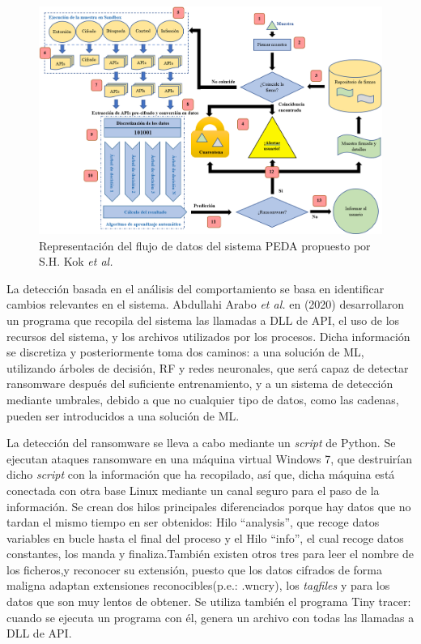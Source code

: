 \begin{figure}[htb]
\begin{center}
\includegraphics[width=1\linewidth]{images/peda2.PNG}
\end{center}
\caption{Representación del flujo de datos del sistema PEDA propuesto por S.H. Kok \textit{et al.} \cite{Kok2020}}
\label{fig:peda2}
\end{figure}

La detección basada en el análisis del comportamiento se basa en identificar cambios relevantes en el sistema. Abdullahi Arabo \textit{et al.} en \cite{ARABO2020289} (2020) desarrollaron un programa que recopila del sistema las llamadas a \gls{DLL} de \gls{API}, el uso de los recursos del sistema, y los archivos utilizados por  los procesos. Dicha información se discretiza y posteriormente toma dos caminos: a una solución de \gls{ML}, utilizando árboles de decisión, \gls{RF} y redes neuronales, que será capaz de detectar ransomware después del suficiente entrenamiento, y a un sistema de detección mediante umbrales, debido a que no cualquier tipo de datos, como las cadenas, pueden ser introducidos a una solución de \gls{ML}.

La detección del ransomware se lleva a cabo mediante un \textit{script} de Python. Se ejecutan ataques ransomware en una máquina virtual Windows 7, que destruirían dicho \textit{script} con la información que ha recopilado, así que, dicha máquina está conectada con otra base Linux mediante un canal seguro para el paso de la información. Se crean dos hilos principales diferenciados porque hay datos que no tardan el mismo tiempo en ser obtenidos: Hilo ``analysis'', que recoge datos variables en bucle hasta el final del proceso y el  Hilo ``info'', el cual recoge datos constantes, los manda y finaliza.También existen otros tres para leer el nombre de los ficheros,y reconocer su extensión, puesto que los datos cifrados de forma maligna adaptan extensiones reconocibles(p.e.: .wncry), los \textit{tagfiles} y para los datos que son muy lentos de obtener. Se utiliza también el programa Tiny tracer: cuando se ejecuta un programa con él, genera un archivo con todas las llamadas a \gls{DLL} de \gls{API}.


